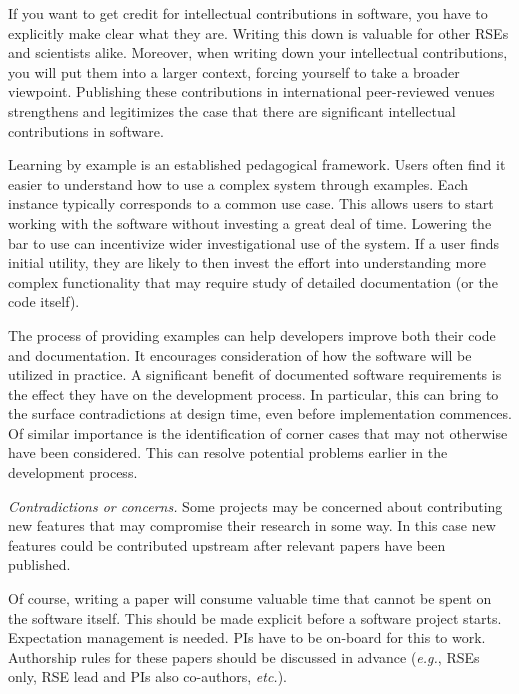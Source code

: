 \documentclass[a4paper,UKenglish]{dagman}
\newcommand{\eg}{\emph{e.g.},\xspace}
\newcommand{\etc}{\emph{etc.}\xspace}
\begin{document}
If you want to get credit for intellectual contributions in software, you have to explicitly make clear what they are. Writing this down is valuable for other RSEs and scientists alike. Moreover, when writing down your intellectual contributions, you will put them into a larger context, forcing yourself to take a broader viewpoint. Publishing these contributions in international peer-reviewed venues strengthens and legitimizes the case that there are significant intellectual contributions in software.


Learning by example is an established pedagogical framework. Users often find it easier to understand how to use a complex system through examples. Each instance typically corresponds to a common use case. This allows users to start working with the software without investing a great deal of time. Lowering the bar to use can incentivize wider investigational use of the system. If a user finds initial utility, they are likely to then invest the effort into understanding more complex functionality that may require study of detailed documentation (or the code itself).

The process of providing examples can help developers improve both their code and documentation. It encourages consideration of how the software will be utilized in practice. A significant benefit of documented software requirements is the effect they have on the development process. In particular, this can bring to the surface contradictions at design time, even before implementation commences. Of similar importance is the identification of corner cases that may not otherwise have been considered. This can resolve potential problems earlier in the development process.

\emph{Contradictions or concerns.}
Some projects may be concerned about contributing new features that may compromise their research in some way. In this case new features could be contributed upstream after relevant papers have been published.

Of course, writing a paper will consume valuable time that cannot be spent on the software itself. This should be made explicit before a software project starts. Expectation management is needed. PIs have to be on-board for this to work. Authorship rules for these papers should be discussed in advance (\eg RSEs only, RSE lead and PIs also co-authors, \etc).
\end{document}
